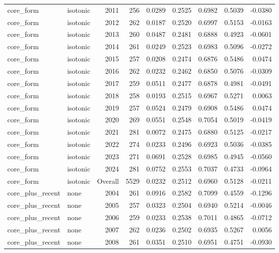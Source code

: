 \begin{table}[t]
\begin{tabular}{@{} l l r r r r r r r @{} }
      core\_form & isotonic & 2011 & 256 & 0.0289 & 0.2525 & 0.6982 & 0.5039 & -0.0380 \\
      core\_form & isotonic & 2012 & 262 & 0.0187 & 0.2520 & 0.6997 & 0.5153 & -0.0163 \\
      core\_form & isotonic & 2013 & 260 & 0.0487 & 0.2481 & 0.6888 & 0.4923 & -0.0601 \\
      core\_form & isotonic & 2014 & 261 & 0.0249 & 0.2523 & 0.6983 & 0.5096 & -0.0272 \\
      core\_form & isotonic & 2015 & 257 & 0.0208 & 0.2474 & 0.6876 & 0.5486 & 0.0474 \\
      core\_form & isotonic & 2016 & 262 & 0.0232 & 0.2462 & 0.6850 & 0.5076 & -0.0309 \\
      core\_form & isotonic & 2017 & 259 & 0.0511 & 0.2477 & 0.6878 & 0.4981 & -0.0491 \\
      core\_form & isotonic & 2018 & 258 & 0.0193 & 0.2515 & 0.6967 & 0.5271 & 0.0063 \\
      core\_form & isotonic & 2019 & 257 & 0.0524 & 0.2479 & 0.6908 & 0.5486 & 0.0474 \\
      core\_form & isotonic & 2020 & 269 & 0.0551 & 0.2548 & 0.7054 & 0.5019 & -0.0419 \\
      core\_form & isotonic & 2021 & 281 & 0.0072 & 0.2475 & 0.6880 & 0.5125 & -0.0217 \\
      core\_form & isotonic & 2022 & 274 & 0.0233 & 0.2496 & 0.6923 & 0.5036 & -0.0385 \\
      core\_form & isotonic & 2023 & 271 & 0.0691 & 0.2528 & 0.6985 & 0.4945 & -0.0560 \\
      core\_form & isotonic & 2024 & 281 & 0.0752 & 0.2553 & 0.7037 & 0.4733 & -0.0964 \\
      core\_form & isotonic & Overall & 5529 & 0.0232 & 0.2512 & 0.6960 & 0.5128 & -0.0211 \\
      core\_plus\_recent & none & 2004 & 261 & 0.0916 & 0.2582 & 0.7099 & 0.4559 & -0.1296 \\
      core\_plus\_recent & none & 2005 & 257 & 0.0323 & 0.2504 & 0.6940 & 0.5214 & -0.0046 \\
      core\_plus\_recent & none & 2006 & 259 & 0.0233 & 0.2538 & 0.7011 & 0.4865 & -0.0712 \\
      core\_plus\_recent & none & 2007 & 262 & 0.0236 & 0.2502 & 0.6935 & 0.5267 & 0.0056 \\
      core\_plus\_recent & none & 2008 & 261 & 0.0351 & 0.2510 & 0.6951 & 0.4751 & -0.0930 \\

\end{tabular}
\end{table}
